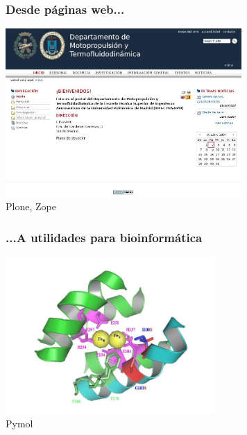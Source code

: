 \documentclass{beamer}
\begin{document}
\begin{frame}
 \frametitle{Desde páginas web...}
\begin{center}
 \includegraphics[width=9cm]{files/snapshot1.jpg}\\
Plone, Zope
\end{center}

\end{frame}

\begin{frame}
 \frametitle{...A utilidades para bioinformática}
\begin{center}
 \includegraphics[width=8cm]{files/pymol.jpg}\\
Pymol
\end{center}

\end{frame}
\end{document}
